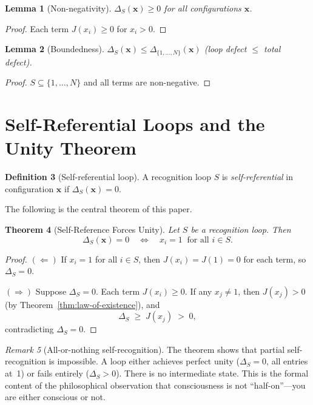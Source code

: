\documentclass[11pt,a4paper]{article}
\theoremstyle{plain}
\newtheorem{theorem}{Theorem}[section]
\newtheorem{lemma}[theorem]{Lemma}
\theoremstyle{definition}
\newtheorem{definition}[theorem]{Definition}
\theoremstyle{remark}
\newtheorem{remark}[theorem]{Remark}
\newcommand{\Jcost}{J}
\begin{document}
\begin{lemma}[Non-negativity]
\label{lem:loop-nonneg}
$\Delta_S(\mathbf{x}) \geq 0$ for all configurations $\mathbf{x}$.
\end{lemma}
\begin{proof}
Each term $\Jcost(x_i) \geq 0$ for $x_i > 0$.
\end{proof}

\begin{lemma}[Boundedness]
$\Delta_S(\mathbf{x}) \leq \Delta_{\{1,\ldots,N\}}(\mathbf{x})$
\;\textup{(loop defect $\leq$ total defect)}.
\end{lemma}
\begin{proof}
$S \subseteq \{1, \ldots, N\}$ and all terms are non-negative.
\end{proof}

\section{Self-Referential Loops and the Unity Theorem}
\label{sec:self-ref}

\begin{definition}[Self-referential loop]
\label{def:self-ref}
A recognition loop $S$ is \emph{self-referential} in configuration
$\mathbf{x}$ if $\Delta_S(\mathbf{x}) = 0$.
\end{definition}

The following is the central theorem of this paper.

\begin{theorem}[Self-Reference Forces Unity]
\label{thm:unity}
Let $S$ be a recognition loop.  Then
\[
  \Delta_S(\mathbf{x}) = 0
  \quad\iff\quad
  x_i = 1 \;\;\text{for all } i \in S.
\]
\end{theorem}

\begin{proof}
$(\Leftarrow)$\;  If $x_i = 1$ for all $i \in S$, then
$\Jcost(x_i) = \Jcost(1) = 0$ for each term, so
$\Delta_S = 0$.

$(\Rightarrow)$\;  Suppose $\Delta_S = 0$.  Each term
$\Jcost(x_i) \geq 0$.  If any $x_j \neq 1$, then
$\Jcost(x_j) > 0$ (by Theorem~\ref{thm:law-of-existence}), and
\[
  \Delta_S \;\geq\; \Jcost(x_j) \;>\; 0,
\]
contradicting $\Delta_S = 0$.
\end{proof}

\begin{remark}[All-or-nothing self-recognition]
The theorem shows that partial self-recognition is impossible.  A loop
either achieves perfect unity ($\Delta_S = 0$, all entries at~1) or
fails entirely ($\Delta_S > 0$).  There is no intermediate state.
This is the formal content of the philosophical observation that
consciousness is not ``half-on''---you are either conscious or not.
\end{remark}
\end{document}
